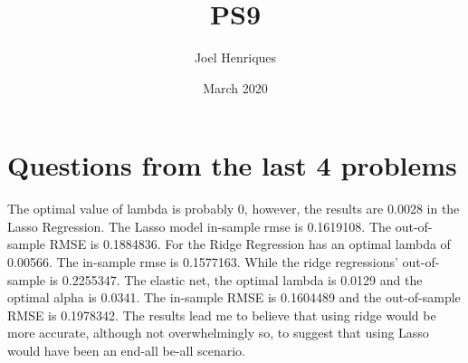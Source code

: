\documentclass{article}
\title{PS9}
\author{Joel Henriques}
\date{March 2020}
\begin{document}
\maketitle

\section{Questions from the last 4 problems}
The optimal value of lambda is probably 0, however, the results are 0.0028 in the Lasso Regression. The Lasso model in-sample rmse is 0.1619108. The out-of-sample RMSE is 0.1884836. For the Ridge Regression has an optimal lambda of 0.00566. The in-sample rmse is 0.1577163. While the ridge regressions' out-of-sample is 0.2255347. The elastic net, the optimal lambda is 0.0129 and the optimal alpha is 0.0341. The in-sample RMSE is 0.1604489 and the out-of-sample RMSE is 0.1978342. The results lead me to believe that using ridge would be more accurate, although not overwhelmingly so, to suggest that using Lasso would have been an end-all be-all scenario. 
\end{document}
